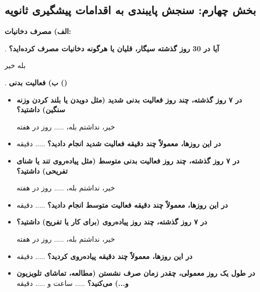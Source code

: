 \subsection*{بخش چهارم: سنجش پایبندی به اقدامات پیشگیری ثانویه}

\noindent \textbf{الف) مصرف دخانیات:}

. \textbf{آیا در 30 روز گذشته سیگار، قلیان یا هرگونه دخانیات مصرف کرده‌اید؟}

\noindent \checkbox{} بله \quad \checkbox{} خیر

\medskip
{}. \textbf{ب) فعالیت بدنی ()}
\begin{itemize}
  \item \textbf{در ۷ روز گذشته، چند روز فعالیت بدنی شدید (مثل دویدن یا بلند کردن وزنه سنگین) داشتید؟}

  \checkbox{} خیر، نداشتم \quad \checkbox{} بله، ..... روز در هفته

  \item \textbf{در این روزها، معمولاً چند دقیقه فعالیت شدید انجام دادید؟} ..... دقیقه

  \item \textbf{در ۷ روز گذشته، چند روز فعالیت بدنی متوسط (مثل پیاده‌روی تند یا شنای تفریحی) داشتید؟}

  \checkbox{} خیر، نداشتم \quad \checkbox{} بله، ..... روز در هفته

  \item \textbf{در این روزها، معمولاً چند دقیقه فعالیت متوسط انجام دادید؟} ..... دقیقه

  \item \textbf{در ۷ روز گذشته، چند روز پیاده‌روی (برای کار یا تفریح) داشتید؟}

  \checkbox{} خیر، نداشتم \quad \checkbox{} بله، ..... روز در هفته

  \item \textbf{در این روزها، معمولاً چند دقیقه پیاده‌روی کردید؟} ..... دقیقه

  \item \textbf{در طول یک روز معمولی، چقدر زمان صرف نشستن (مطالعه، تماشای تلویزیون و...) می‌کنید؟} ..... ساعت و ..... دقیقه
\end{itemize}

